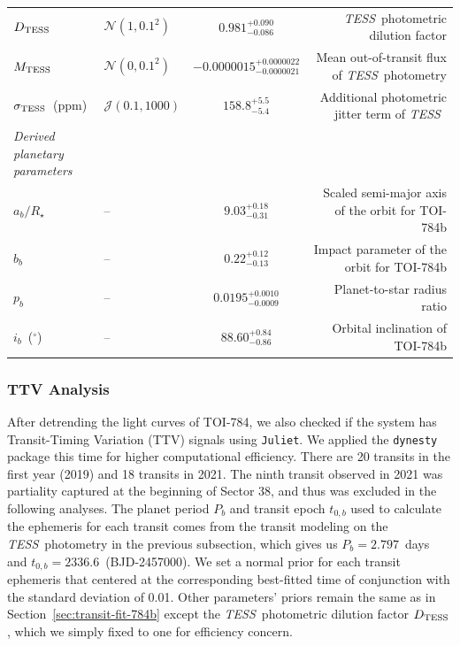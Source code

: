 \documentclass[twocolumn]{aastex631}
\newcommand{\code}[1]{{\texttt{#1}}}
\newcommand{\tess}{\textit{TESS}\ }
\begin{document}
\begin{table}
\begin{tabular}{llcr}
		$D_{\rm{TESS}}$ & $\mathcal{N}(1, 0.1^2)$ & $0.981^{+0.090}_{-0.086}$ & \tess photometric dilution factor\\
		$M_{\rm{TESS}}$ & $\mathcal{N}(0, 0.1^2)$ & $-0.0000015^{+0.0000022}_{-0.0000021}$ & Mean out-of-transit flux of \tess photometry\\
		$\sigma_{\rm{TESS}}$~(ppm) & $\mathcal{J}(0.1, 1000)$ & $158.8^{+5.5}_{-5.4}$ & Additional photometric jitter term of \tess\\
        \textit{Derived planetary parameters}\\
        $a_b/R_{\star}$ & -- & $9.03^{+0.18}_{-0.31}$ & Scaled semi-major axis of the orbit for TOI-784b\\
        $b_b$ & -- & $0.22^{+0.12}_{-0.13}$ & Impact parameter of the orbit for TOI-784b\\
        $p_b$ & -- & $0.0195^{+0.0010}_{-0.0009}$ & Planet-to-star radius ratio\\
        $i_b$~($^{\circ}$) & -- & $88.60^{+0.84}_{-0.86}$ & Orbital inclination of TOI-784b\\        
 		\hline
 	\end{tabular}
\end{table}


\subsubsection{TTV Analysis}
\label{sec:TTV}

After detrending the light curves of TOI-784, we also checked if the system has Transit-Timing Variation (TTV) signals using \code{Juliet}. We applied the \code{dynesty} package this time for higher computational efficiency. There are 20 transits in the first year (2019) and 18 transits in 2021. The ninth transit observed in 2021 was partiality captured at the beginning of Sector 38, and thus was excluded in the following analyses. The planet period $P_b$ and transit epoch $t_{0,b}$ used to calculate the ephemeris for each transit comes from the transit modeling on the \tess photometry in the previous subsection, which gives us $P_b = 2.797$~days and $t_{0,b} = 2336.6$~(BJD-2457000). We set a normal prior for each transit ephemeris that centered at the corresponding best-fitted time of conjunction with the standard deviation of 0.01. Other parameters' priors remain the same as in Section~\ref{sec:transit-fit-784b} except the \tess photometric dilution factor $D_{\rm{TESS}}$, which we simply fixed to one for efficiency concern. 
\end{document}
